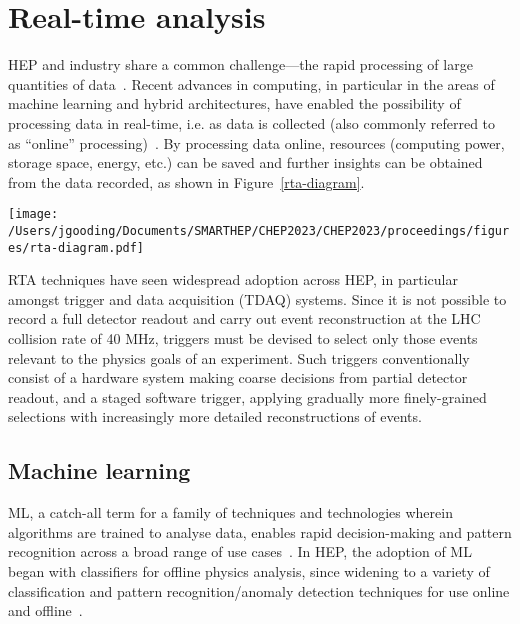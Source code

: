 \section{Real-time analysis}
\label{rta}
HEP and industry share a common challenge—the rapid processing of large quantities of data~\cite{hu-big-data}. Recent advances in computing, in particular in the areas of machine learning and hybrid architectures, have enabled the possibility of processing data in real-time, i.e. as data is collected (also commonly referred to as ``online'' processing)~\cite{real-time-computing}. By processing data online, resources (computing power, storage space, energy, etc.) can be saved and further insights can be obtained from the data recorded, as shown in Figure~\ref{rta-diagram}.

\begin{figure*}[h!]
    \centering
    \texttt{[image: /Users/jgooding/Documents/SMARTHEP/CHEP2023/CHEP2023/proceedings/figures/rta-diagram.pdf]}
    \caption{Traditional and RTA approaches to data processing. Traditional approaches rely on recording all data and processing this offilne; in RTA, data is processed as it is produced, recording only the relevant portions, enabling greater volumes of processed data to be stored.}
    \label{rta-diagram}
\end{figure*}

RTA techniques have seen widespread adoption across HEP, in particular amongst trigger and data acquisition (TDAQ) systems. Since it is not possible to record a full detector readout and carry out event reconstruction at the LHC collision rate of {40}{ MHz}, triggers must be devised to select only those events relevant to the physics goals of an experiment. Such triggers conventionally consist of a hardware system making coarse decisions from partial detector readout, and a staged software trigger, applying gradually more finely-grained selections with increasingly more detailed reconstructions of events.

\subsection{Machine learning}
\label{machine-learning}
ML, a catch-all term for a family of techniques and technologies wherein algorithms are trained to analyse data, enables rapid decision-making and pattern recognition across a broad range of use cases~\cite{intro-ml}. In HEP, the adoption of ML began with classifiers for offline physics analysis, since widening to a variety of classification and pattern recognition/anomaly detection techniques for use online and offline~\cite{albertsson-ml}.

